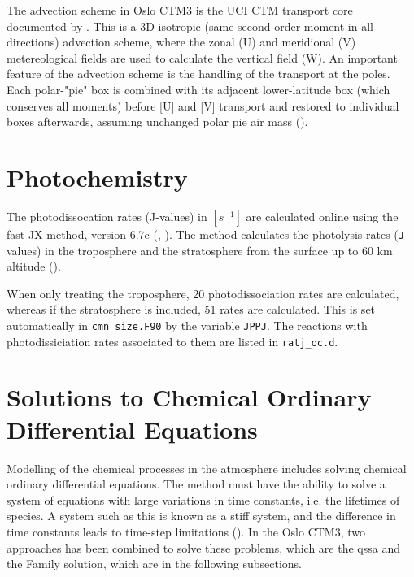 \medskip

The advection scheme in Oslo CTM3 is the UCI CTM transport core documented by \cite{Prather2008}. This is a 3D isotropic (same second order moment in all directions) advection scheme, where the zonal (U) and meridional (V) metereological fields are used to calculate the vertical field (W). An important feature of the advection scheme is the handling of the transport at the poles. Each polar-"pie" box is combined with its adjacent lower-latitude box (which conserves all moments) before [U] and [V] transport and restored to individual boxes afterwards, assuming unchanged polar pie air mass (\cite{Sovde2012}). 


\section{Photochemistry}\label{sec:CTM3_photochemistry}

The photodissocation rates (J-values) in $[s^{-1}]$ are calculated online using the fast-JX method, version 6.7c (\cite{FastJX}, \cite{SovdeManual}). The method calculates the photolysis rates (\texttt{J}-values) in the troposphere and the stratosphere from the surface up to 60 km altitude (\cite{Sovde2012}). 

\medskip

When only treating the troposphere, 20 photodissociation rates are calculated, whereas if the stratosphere is included, 51 rates are calculated. This is set automatically in \texttt{cmn\_size.F90} by the variable \texttt{JPPJ}. The reactions with photodissiciation rates associated to them are listed in \texttt{ratj\_oc.d}. 

\section{Solutions to Chemical Ordinary Differential Equations}

Modelling of the chemical processes in the atmosphere includes solving chemical ordinary differential equations. The method must have the ability to solve a system of equations with large variations in time constants, i.e. the lifetimes of species. A system such as this is known as a stiff system, and the difference in time constants leads to time-step limitations (\cite{AtmModFund}). In the Oslo CTM3, two approaches has been combined to solve these problems, which are the \acrfull{qssa} and the Family solution, which are in the following subsections. 

